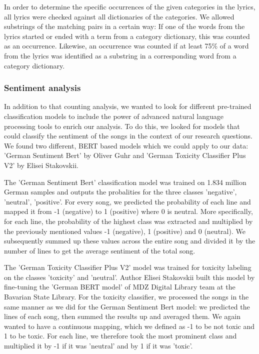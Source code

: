 In order to determine the specific occurrences of the given categories in the lyrics, all lyrics were checked against all dictionaries of the categories. We allowed substrings of the matching pairs in a certain way: If one of the words from the lyrics started or ended with a term from a category dictionary, this was counted as an occurrence. Likewise, an occurrence was counted if at least 75\% of a word from the lyrics was identified as a substring in a corresponding word from a category dictionary.

\subsubsection*{Sentiment analysis}

In addition to that counting analysis, we wanted to look for different pre-trained classification models to include the power of advanced natural language processing tools to enrich our analysis. To do this, we looked for models that could classify the sentiment of the songs in the context of our research questions. We found two different, BERT \cite{bert} based models which we could apply to our data: 'German Sentiment Bert' \cite{gbert} by Oliver Guhr and 'German Toxicity Classifier Plus V2' \cite{toxicity} by Elisei Stakovskii.

The 'German Sentiment Bert' classification model was trained on 1.834 million German samples and outputs the probalities for the three classes 'negative', 'neutral', 'positive'. For every song, we predicted the probability of each line and mapped it from -1 (negative) to 1 (positive) where 0 is neutral. More specifically, for each line, the probability of the highest class was extracted and multiplied by the previously mentioned values -1 (negative), 1 (positive) and 0 (neutral). We subsequently summed up these values across the entire song and divided it by the number of lines to get the average sentiment of the total song.

The 'German Toxicity Classifier Plus V2' model was trained for toxicity labeling on the classes 'toxicity' and 'neutral'. Author Elisei Stakovskii built this model by fine-tuning the 'German BERT model' of MDZ Digital Library team at the Bavarian State Library. For the toxicity classifier, we processed the songs in the same manner as we did for the German Sentiment Bert model: we predicted the lines of each song, then summed the results up and averaged them. We again wanted to have a continuous mapping, which we defined as -1 to be not toxic and 1 to be toxic. For each line, we therefore took the most prominent class and multiplied it by -1 if it was 'neutral' and by 1 if it was 'toxic'.

